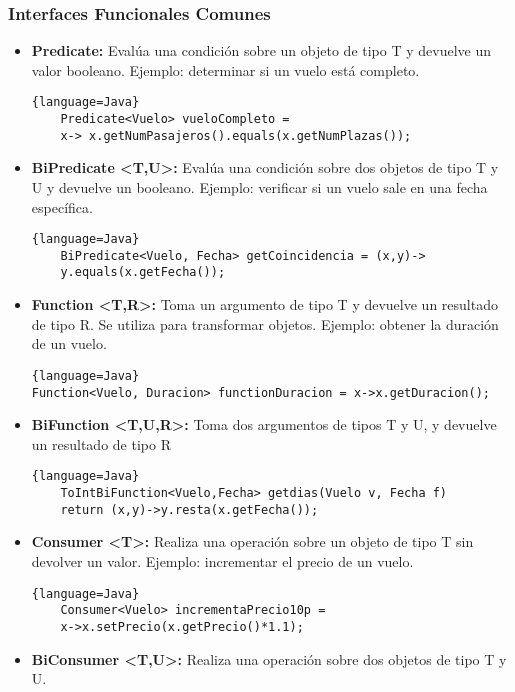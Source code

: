 \begin{center}
	\subsubsection{Interfaces Funcionales Comunes}
	\begin{itemize}
		\item \textbf{Predicate:}  Evalúa una condición sobre un objeto de tipo T
		      y devuelve un valor booleano. Ejemplo: determinar si un vuelo está completo.

		      \begin{lstlisting}{language=Java}
    Predicate<Vuelo> vueloCompleto = 
    x-> x.getNumPasajeros().equals(x.getNumPlazas());
                    \end{lstlisting}
		\item \textbf{BiPredicate <T,U>:} Evalúa una condición sobre dos objetos
		      de tipo T y U y devuelve un booleano.
		      Ejemplo: verificar si un vuelo sale en una fecha específica.
		      \begin{lstlisting}{language=Java}
    BiPredicate<Vuelo, Fecha> getCoincidencia = (x,y)->
    y.equals(x.getFecha());
                \end{lstlisting}
		\item \textbf{Function <T,R>:}  Toma un argumento de tipo T y devuelve un resultado de tipo R.
		      Se utiliza para transformar objetos. Ejemplo: obtener la duración de un vuelo.
		      \begin{lstlisting}{language=Java}
Function<Vuelo, Duracion> functionDuracion = x->x.getDuracion();
        \end{lstlisting}
		\item \textbf{BiFunction <T,U,R>:}  Toma dos argumentos de tipos T y U, y devuelve un resultado de tipo R
		      \begin{lstlisting}{language=Java}
    ToIntBiFunction<Vuelo,Fecha> getdias(Vuelo v, Fecha f)
    return (x,y)->y.resta(x.getFecha());
        \end{lstlisting}
		\item \textbf{Consumer <T>:}  Realiza una operación sobre un objeto de tipo T sin devolver
		      un valor. Ejemplo: incrementar el precio de un vuelo.
		      \begin{lstlisting}{language=Java}
    Consumer<Vuelo> incrementaPrecio10p = 
    x->x.setPrecio(x.getPrecio()*1.1);
        \end{lstlisting}
		\item \textbf{BiConsumer <T,U>:}  Realiza una operación sobre dos objetos de tipo T y U.

\end{itemize}
\end{center}
